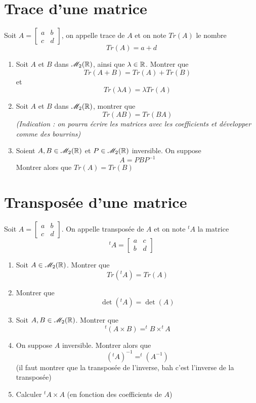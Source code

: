 \section{Trace d'une matrice}
Soit $A = \begin{bmatrix}a & b \\ c & d\end{bmatrix}$, on appelle trace de $A$ et on note $Tr(A)$ le nombre $$Tr(A) = a + d$$
\begin{enumerate}
\item Soit $A$ et $B$ dans $\mathscr{M}_2(\mathbb{R})$, ainsi que $\lambda \in \mathbb{R}$. Montrer que $$Tr(A+B) = Tr(A) + Tr(B)$$ et $$Tr(\lambda A) = \lambda Tr(A)$$
\item Soit $A$ et $B$ dans $\mathscr{M}_2(\mathbb{R})$, montrer que $$Tr(AB) = Tr(BA)$$ \emph{(Indication : on pourra écrire les matrices avec les coefficients et développer comme des bourrins)}
\item Soient $A,B \in \mathscr{M}_2(\mathbb{R})$ et $P\in\mathscr{M}_2(\mathbb{R})$ inversible. On suppose 
$$A = PBP^{-1}$$
Montrer alors que $Tr(A) = Tr(B)$
\end{enumerate}
\section{Transposée d'une matrice}
Soit $A = \begin{bmatrix} a & b \\ c & d \end{bmatrix}$. On appelle transposée de $A$ et on note $^tA$ la matrice 
$$^tA = \begin{bmatrix} a & c \\ b & d \end{bmatrix}$$
\begin{enumerate}
\item Soit $A\in \mathscr{M}_2(\mathbb{R})$. Montrer que $$Tr(^tA)=Tr(A)$$
\item Montrer que $$\det(^tA) = \det(A)$$
\item Soit $A,B\in \mathscr{M}_2(\mathbb{R})$. Montrer que $$^t(A\times B) = ^tB\times ^tA$$
\item On suppose $A$ inversible. Montrer alors que $$(^tA)^{-1} = ^t(A^{-1})$$ (il faut montrer que la transposée de l'inverse, bah c'est l'inverse de la transposée)
\item Calculer $^tA\times A$ (en fonction des coefficients de $A$)
\end{enumerate}
